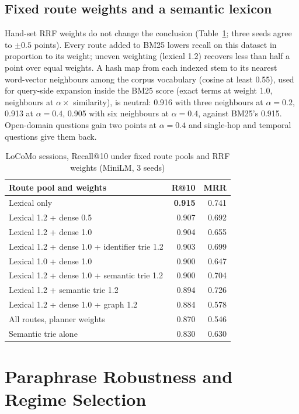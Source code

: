 \documentclass[journal]{IEEEtran}
\begin{document}
\subsection{Fixed route weights and a semantic lexicon}
\label{sec:routeweights}
Hand-set RRF weights do not change the conclusion (Table~\ref{tab:weights}; three seeds agree to $\pm 0.5$ points). Every route added to BM25 lowers recall on this dataset in proportion to its weight; uneven weighting (lexical 1.2) recovers less than half a point over equal weights. A hash map from each indexed stem to its nearest word-vector neighbours among the corpus vocabulary (cosine at least 0.55), used for query-side expansion inside the BM25 score (exact terms at weight 1.0, neighbours at $\alpha \times$ similarity), is neutral: 0.916 with three neighbours at $\alpha = 0.2$, 0.913 at $\alpha = 0.4$, 0.905 with six neighbours at $\alpha = 0.4$, against BM25's 0.915. Open-domain questions gain two points at $\alpha = 0.4$ and single-hop and temporal questions give them back.

\begin{table}[t]
\caption{LoCoMo sessions, Recall@10 under fixed route pools and RRF weights (MiniLM, 3 seeds)}
\label{tab:weights}
\centering
\scriptsize
\begin{tabular}{lrr}
\toprule
Route pool and weights & R@10 & MRR \\
\midrule
Lexical only & \textbf{0.915} & 0.741 \\
Lexical 1.2 + dense 0.5 & 0.907 & 0.692 \\
Lexical 1.2 + dense 1.0 & 0.904 & 0.655 \\
Lexical 1.2 + dense 1.0 + identifier trie 1.2 & 0.903 & 0.699 \\
Lexical 1.0 + dense 1.0 & 0.900 & 0.647 \\
Lexical 1.2 + dense 1.0 + semantic trie 1.2 & 0.900 & 0.704 \\
Lexical 1.2 + semantic trie 1.2 & 0.894 & 0.726 \\
Lexical 1.2 + dense 1.0 + graph 1.2 & 0.884 & 0.578 \\
All routes, planner weights & 0.870 & 0.546 \\
Semantic trie alone & 0.830 & 0.630 \\
\bottomrule
\end{tabular}
\end{table}

\section{Paraphrase Robustness and Regime Selection}
\end{document}
